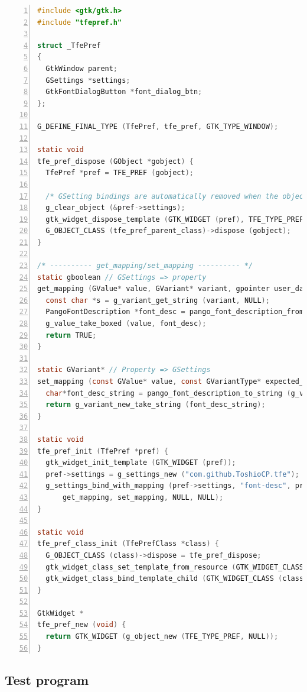 \begin{lstlisting}[language=C, numbers=left]
#include <gtk/gtk.h>
#include "tfepref.h"

struct _TfePref
{
  GtkWindow parent;
  GSettings *settings;
  GtkFontDialogButton *font_dialog_btn;
};

G_DEFINE_FINAL_TYPE (TfePref, tfe_pref, GTK_TYPE_WINDOW);

static void
tfe_pref_dispose (GObject *gobject) {
  TfePref *pref = TFE_PREF (gobject);

  /* GSetting bindings are automatically removed when the object is finalized, so it isn't necessary to unbind them explicitly.*/
  g_clear_object (&pref->settings);
  gtk_widget_dispose_template (GTK_WIDGET (pref), TFE_TYPE_PREF);
  G_OBJECT_CLASS (tfe_pref_parent_class)->dispose (gobject);
}

/* ---------- get_mapping/set_mapping ---------- */
static gboolean // GSettings => property
get_mapping (GValue* value, GVariant* variant, gpointer user_data) {
  const char *s = g_variant_get_string (variant, NULL);
  PangoFontDescription *font_desc = pango_font_description_from_string (s);
  g_value_take_boxed (value, font_desc);
  return TRUE;
}

static GVariant* // Property => GSettings
set_mapping (const GValue* value, const GVariantType* expected_type, gpointer user_data) {
  char*font_desc_string = pango_font_description_to_string (g_value_get_boxed (value));
  return g_variant_new_take_string (font_desc_string);
}

static void
tfe_pref_init (TfePref *pref) {
  gtk_widget_init_template (GTK_WIDGET (pref));
  pref->settings = g_settings_new ("com.github.ToshioCP.tfe");
  g_settings_bind_with_mapping (pref->settings, "font-desc", pref->font_dialog_btn, "font-desc", G_SETTINGS_BIND_DEFAULT,
      get_mapping, set_mapping, NULL, NULL);
}

static void
tfe_pref_class_init (TfePrefClass *class) {
  G_OBJECT_CLASS (class)->dispose = tfe_pref_dispose;
  gtk_widget_class_set_template_from_resource (GTK_WIDGET_CLASS (class), "/com/github/ToshioCP/tfe/tfepref.ui");
  gtk_widget_class_bind_template_child (GTK_WIDGET_CLASS (class), TfePref, font_dialog_btn);
}

GtkWidget *
tfe_pref_new (void) {
  return GTK_WIDGET (g_object_new (TFE_TYPE_PREF, NULL));
}
\end{lstlisting}

\subsection{Test program}\label{test-program}

